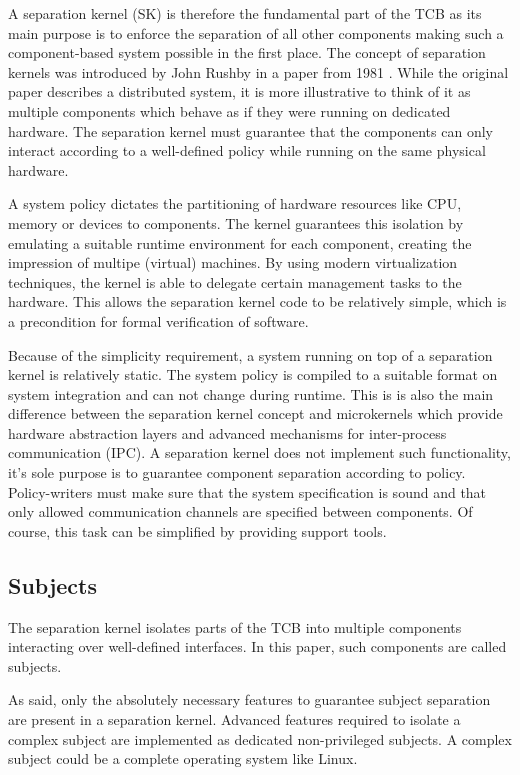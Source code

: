 A separation kernel (SK) is therefore the fundamental
part of the TCB as its main purpose is to enforce the separation of all other
components making such a component-based system possible in the first place. The
concept of separation kernels was introduced by John Rushby in a paper from 1981
\cite{rushby1981}. While the original paper describes a distributed system, it
is more illustrative to think of it as multiple components which behave as if
they were running on dedicated hardware. The separation kernel must guarantee
that the components can only interact according to a well-defined policy while
running on the same physical hardware.

A system policy dictates the partitioning of hardware resources like CPU, memory
or devices to components. The kernel guarantees this isolation by emulating a
suitable runtime environment for each component, creating the impression of
multipe (virtual) machines. By using modern virtualization techniques, the
kernel is able to delegate certain management tasks to the hardware. This allows
the separation kernel code to be relatively simple, which is a precondition for
formal verification of software.

Because of the simplicity requirement, a system running on top of a separation
kernel is relatively static. The system policy is compiled to a suitable format
on system integration and can not change during runtime. This is is also the
main difference between the separation kernel concept and microkernels which
provide hardware abstraction layers and advanced mechanisms for inter-process
communication (IPC). A separation kernel does not implement such
functionality, it's sole purpose is to guarantee component separation according
to policy. Policy-writers must make sure that the system specification is sound
and that only allowed communication channels are specified between components.
Of course, this task can be simplified by providing support tools.

\subsection{Subjects}
The separation kernel isolates parts of the TCB into multiple
components interacting over well-defined interfaces. In this
paper, such components are called subjects.

As said, only the absolutely necessary features to guarantee subject separation
are present in a separation kernel. Advanced features required to isolate a
complex subject are implemented as dedicated non-privileged subjects. A complex
subject could be a complete operating system like Linux.

